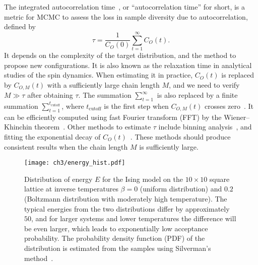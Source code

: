 The integrated autocorrelation time~\cite{ambegaokar2010estimating, goodman2010ensemble}, or ``autocorrelation time'' for short, is a metric for MCMC to assess the loss in sample diversity due to autocorrelation, defined by
\begin{equation}
\tau = \frac{1}{C_O(0)} \sum_{t = 1}^\infty C_O(t).
\label{eq:iat}
\end{equation}
It depends on the complexity of the target distribution, and the method to propose new configurations. It is also known as the relaxation time in analytical studies of the spin dynamics. When estimating it in practice, $C_O(t)$ is replaced by $C_{O, M}(t)$ with a sufficiently large chain length $M$, and we need to verify $M \gg \tau$ after obtaining $\tau$. The summation $\sum_{t = 1}^\infty$ is also replaced by a finite summation $\sum_{t = 1}^{t_\text{cutoff}}$, where $t_\text{cutoff}$ is the first step when $C_{O, M}(t)$ crosses zero~\cite{wu2021unbiased}. It can be efficiently computed using fast Fourier transform (FFT) by the Wiener--Khinchin theorem~\cite{wiener1930generalized}. Other methods to estimate $\tau$ include binning analysis~\cite{wallerberger2018efficient}, and fitting the exponential decay of $C_O(t)$~\cite{bialas2023analysis}. These methods should produce consistent results when the chain length $M$ is sufficiently large.

\begin{figure}[htb]
\centering
\texttt{[image: ch3/energy\_hist.pdf]}
\caption[Distribution of energy for Ising model at different temperatures]{
Distribution of energy $E$ for the Ising model on the $10 \times 10$ square lattice at inverse temperatures $\beta = 0$ (uniform distribution) and $0.2$ (Boltzmann distribution with moderately high temperature).
The typical energies from the two distributions differ by approximately $50$, and for larger systems and lower temperatures the difference will be even larger, which leads to exponentially low acceptance probability.
The probability density function (PDF) of the distribution is estimated from the samples using Silverman’s method~\cite{silverman1986density}.
}
\label{fig:energy-hist}
\end{figure}

